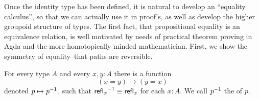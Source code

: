 Once the identity type has been defined, it is natural to develop an ``equality
calculus'',  so that we can actually use it in proof's, as well as develop the
higher groupoid structure of types. The first fact, that propositional equality
is an equivalence relation, is well motivated by needs of practical theorem
proving in Agda and the more homotopically minded mathematician. First, we show the symmetry of equality--that paths are reversible.

\begin{lem}\label{lem:opp}
  For every type $A$ and every $x,y:A$ there is a function
  \begin{equation*}
    (x= y)\to(y= x)
  \end{equation*}
  denoted $p\mapsto \mathord{{p}^{-1}}$, such that $\mathord{{\mathsf{refl}_{x}}^{-1}}\equiv\mathsf{refl}_{x}$ for each $x:A$.
  We call $\mathord{{p}^{-1}}$ the  of $p$.
\end{lem}

